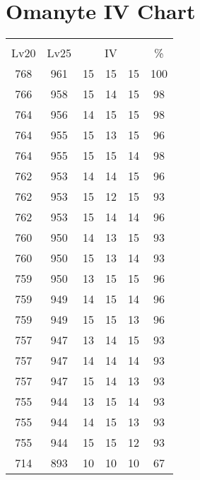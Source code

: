 \documentclass{article}%
\begin{document}
%
\normalsize%
\section{Omanyte IV Chart}%
\label{sec:Omanyte IV Chart}%
\renewcommand{\arraystretch}{1.5}%
\begin{tabular}{|c|c|c|c|c|c|}%
\hline%
\multicolumn{6}{|c|}{\textcolor{white}{ 
\linebreak{Omanyte}
}%
\cellcolor{black}}\\%
\multicolumn{1}{|c}{Lv20}&\multicolumn{1}{c|}{Lv25}&\multicolumn{3}{c|}{IV}&\multicolumn{1}{|c|}{\%}\\%
\hline%
\rowcolor{color100}%
768&961&15&15&15&100\\%
\hline%
\rowcolor{color98}%
766&958&15&14&15&98\\%
\hline%
\rowcolor{color98}%
764&956&14&15&15&98\\%
\hline%
\rowcolor{color96}%
764&955&15&13&15&96\\%
\hline%
\rowcolor{color98}%
764&955&15&15&14&98\\%
\hline%
\rowcolor{color96}%
762&953&14&14&15&96\\%
\hline%
\rowcolor{color93}%
762&953&15&12&15&93\\%
\hline%
\rowcolor{color96}%
762&953&15&14&14&96\\%
\hline%
\rowcolor{color93}%
760&950&14&13&15&93\\%
\hline%
\rowcolor{color93}%
760&950&15&13&14&93\\%
\hline%
\rowcolor{color96}%
759&950&13&15&15&96\\%
\hline%
\rowcolor{color96}%
759&949&14&15&14&96\\%
\hline%
\rowcolor{color96}%
759&949&15&15&13&96\\%
\hline%
\rowcolor{color93}%
757&947&13&14&15&93\\%
\hline%
\rowcolor{color93}%
757&947&14&14&14&93\\%
\hline%
\rowcolor{color93}%
757&947&15&14&13&93\\%
\hline%
\rowcolor{color93}%
755&944&13&15&14&93\\%
\hline%
\rowcolor{color93}%
755&944&14&15&13&93\\%
\hline%
\rowcolor{color93}%
755&944&15&15&12&93\\%
\hline%
\rowcolor{color91}%
714&893&10&10&10&67\\%
\end{tabular}

%
\end{document}
